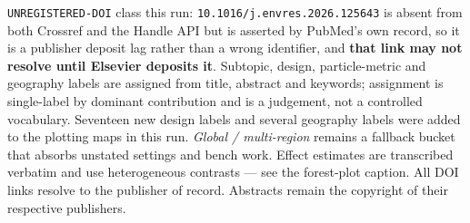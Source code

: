 \documentclass[10pt]{article}
\begin{document}
\begin{keybox}
{\texttt{UNREGISTERED-DOI} class this run: \texttt{10.1016/j.envres.2026.125643} is absent from
both Crossref and the Handle API but is asserted by PubMed's own record, so it is a publisher
deposit lag rather than a wrong identifier, and \textbf{that link may not resolve until
Elsevier deposits it}.
Subtopic, design, particle-metric and geography labels are assigned from title, abstract and
keywords; assignment is single-label by dominant contribution and is a judgement, not a
controlled vocabulary. Seventeen new design labels and several geography labels were added to
the plotting maps in this run. \textit{Global / multi-region} remains a fallback bucket that
absorbs unstated settings and bench work. Effect estimates are transcribed verbatim and use
heterogeneous contrasts --- see the forest-plot caption.
All DOI links resolve to the publisher of record. Abstracts remain the copyright of their
respective publishers.\par}
\end{keybox}
\end{document}
